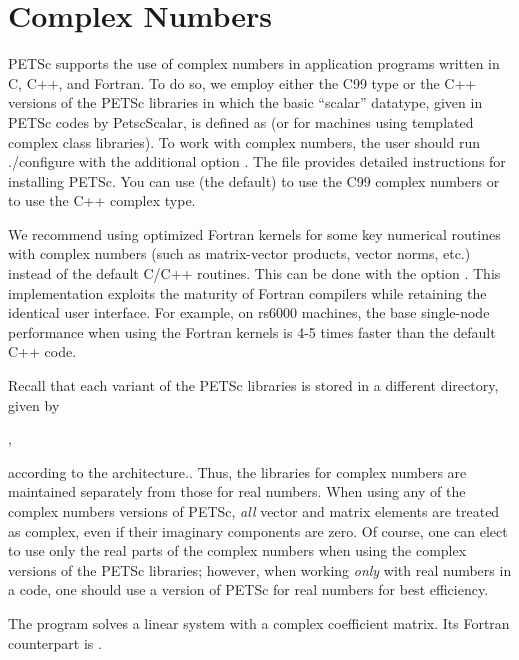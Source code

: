 {{%
\section{Complex Numbers}  \label{sec_complex}

PETSc supports the use of complex numbers in application programs
written in C, C++, and Fortran.  To do so, we employ either the C99  type or the C++ versions of
the PETSc libraries in which the basic ``scalar'' datatype, given in
PETSc codes by PetscScalar, is defined as  (or  for machines using templated complex class
libraries).  To work with complex numbers,
the user should run ./configure with the additional option .
The file 
provides detailed instructions for installing PETSc. You can use  (the default) to use the C99 complex numbers or  to use the C++ complex type.


We recommend using optimized Fortran kernels for some key numerical
routines with complex numbers (such as matrix-vector products, vector
norms, etc.) instead of the default C/C++ routines.  This can be done with the   option .
This implementation exploits the
maturity of Fortran compilers while retaining the identical user
interface.  For example, on rs6000 machines, the base single-node
performance when using the Fortran kernels is 4-5 times faster than
the default C++ code.


Recall that each variant of the PETSc libraries is stored in a
different directory, given by
\begin{tabbing}
  ,
\end{tabbing}
according to the architecture.. Thus, the
libraries for complex
numbers are maintained separately from those for real
numbers.  When using any of the complex numbers versions of PETSc,
{\em all} vector and matrix elements are treated as complex,
even if their imaginary components are zero.
Of course, one can elect to use only the real parts of the complex
numbers when using the complex versions of the PETSc libraries;
however, when working {\em only} with real numbers in a code,
one should use a version of PETSc for real numbers for best efficiency.

The program 
solves a linear system with a complex
coefficient matrix.  Its Fortran counterpart is
.

}}
